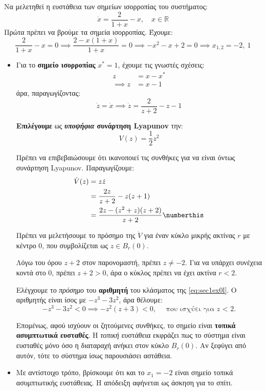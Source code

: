 \documentclass[11pt,a4paper,notitlepage,fleqn]{article}
\begin{document}
\begin{exercise}
	Να μελετηθεί η ευστάθεια των σημείων ισορροπίας του συστήματος:
	\[
	\dot x = \frac{2}{1+x}-x,\quad x\in\mathbb R
	\]
	\tcblower
	Πρώτα πρέπει να βρούμε τα σημεία ισορροπίας. Έχουμε:
	\[
	\frac{2}{1+x} - x = 0 \implies \frac{2-x(1+x)}{1+x} = 0
	\implies -x^2 -x +2 = 0 \implies x_{1,2} = -2,\ 1
	\]

	\begin{itemize}
		\item Για το \textbf{σημείο ισορροπίας} \( x^* = 1 \), έχουμε τις γνωστές
		σχέσεις:
		\begin{align*}
			z &= x-x^* \\ \implies
			z &= x-1
		\end{align*}
		άρα, παραγωγίζοντας:
		\[
		\dot z = \dot x \implies \dot z = \frac{2}{z+2} -z -1
		\]

		\textbf{Επιλέγουμε} ως \textbf{\textit{υποψήφια} συνάρτηση Lyapunov} την:
		\[
		V(z) = \frac{1}{2} z^2
		\]

		Πρέπει να επιβεβαιώσουμε ότι ικανοποιεί τις συνθήκες για να είναι όντως
		συνάρτηση Lyapunov. Παραγωγίζουμε:
		\begin{align*}
			\dot V(z) &= z\dot z \\
			 &= \frac{2z}{z+2} - z(z+1) \\
			&= \frac{2z-(z^2+z)(z+2)}{z+2} \numberthis \label{eq:sec1ex0l}
		\end{align*}

		Πρέπει να μελετήσουμε το πρόσημο της \( \dot V \) για έναν κύκλο
		μικρής ακτίνας \( r \) με κέντρο 0, που συμβολίζεται ως \( z \in B_r(0) \).

		Λόγω του όρου \( z+2 \) στον παρονομαστή, πρέπει \( z\neq -2 \). Για να υπάρχει
		συνέχεια κοντά στο 0, πρέπει \( z+2 > 0 \), άρα ο κύκλος πρέπει να έχει ακτίνα
		\( r < 2 \).

		Ελέγχουμε το \textit{πρόσημο} του \textbf{αριθμητή} του κλάσματος της \eqref{eq:sec1ex0l}. Ο αριθμητής είναι ίσος με \( -z^3-3z^2 \), άρα θέλουμε:
		\[
		-z^3 - 3z^2 < 0 \implies -z^2(z+3) < 0, \quad \text{ που ισχύει για $z$ < 2}.
		\]

		Επομένως, αφού ισχύουν οι ζητούμενες συνθήκες, το σημείο είναι
		\textbf{τοπικά ασυμπτωτικά ευσταθές}. Η \textit{τοπική} ευστάθεια εκφράζει πως το
		σύστημα είναι ευσταθές μόνο όσο η διαταραχή ανήκει στον κύκλο \( B_r(0) \). Αν
		ξεφύγει από αυτόν, τότε το σύστημα ίσως παρουσιάσει αστάθεια.

		\item Με αντίστοιχο τρόπο, βρίσκουμε ότι και το \( x_1 = -2 \) είναι σημείο
		τοπικά ασυμπτωτικής ευστάθειας. Η απόδειξη αφήνεται ως άσκηση για το σπίτι.
	\end{itemize}
\end{exercise}
\end{document}
